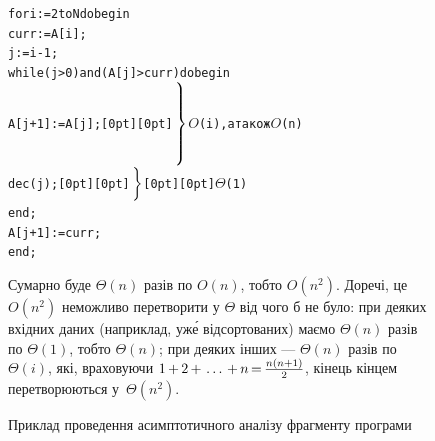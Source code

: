\documentclass[14pt,a4paper]{extarticle}
\def\dib#1{\,#1\discretionary{}{\mbox{$#1$}}{}\,}
\renewcommand{\baselinestretch}{1.3125}
\begin{document}
\begin{figure}[!b]
\begin{center}
\begin{minipage}{0.99\textwidth}
\vspace*{-0.5\baselineskip}
\hrulefill
\vspace*{-0.75\baselineskip}

\renewcommand{\baselinestretch}{1}
\begin{small}
\begin{alltt}
  for i:=2 to N do begin
    curr := A[i];
    j := i-1;
    while (j>0) and (A[j]>curr) do begin
      A[j+1] := A[j];                   \raisebox{0pt}[0pt][0pt]{\begin{math}\left.\vphantom{\begin{array}{c}a\\a\\a\\a\\a\end{array}}\right\}\end{math}} {\begin{math}O\end{math}(i), а також \begin{math}O\end{math}(n)}
      dec(j);         \raisebox{0.5\baselineskip}[0pt][0pt]{\begin{math}\left.\vphantom{\begin{array}{c}a\\a\end{array}}\right\}\end{math}} \raisebox{0.5\baselineskip}[0pt][0pt]{\begin{math}\Theta\end{math}(1)}
    end;
    A[j+1] := curr;
  end;
\end{alltt}
\vspace*{-\baselineskip}
\end{small}

\begin{small}
Сумарно буде $\Theta(n)$ разів по $O(n)$, тобто $O(n^2)$.
До\nolinebreak[3] речі, це $O(n^2)$ неможливо перетворити у $\Theta$ від чого б не було: при деяких вхідних даних (наприклад, уж\'{е} відсортованих) маємо $\Theta(n)$ разів по $\Theta(1)$, тобто $\Theta(n)$; при деяких інших --- $\Theta(n)$ разів по $\Theta(i)$, які, враховуючи $1\dib{{+}}2\dib{{+}}\dots\dib{{+}}n\dib{{=}}\frac{n(n+1)}{2}$, кінець кінцем перетворюються у~$\Theta(n^2)$.

\end{small}
\end{minipage}
\end{center}
\caption{Приклад проведення асимптотичного аналізу фрагменту програми}
\label{fig:example-of-asympthotic analysis}
\end{figure}
\end{document}
